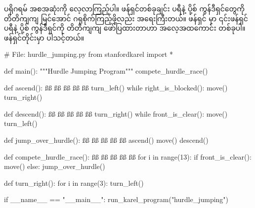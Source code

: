 ပရိုဂရမ် အစအဆုံးကို လေ့လာကြည့်ပါ။ ဖန်ရှင်တစ်ခုချင်း ပရီနဲ့ ပို့စ် ကွန်ဒီရှင်တွေကို တိတိကျကျ မြင်အောင် ဂရုစိုက်ကြည့်ဖို့လည်း အရေးကြီးတယ်။ ဖန်ရှင်  မှာ ၎င်းဖန်ရှင် ပရီနဲ့ ပို့စ် ကွန်ဒီရှင်ကို တိတိကျကျ ဖော်ပြထားတာဟာ အလေ့အထကောင်း တစ်ခုပါ။ ဖန်ရှင်တိုင်းမှာ ပါသင့်တယ်။

%
\begin{py}
# File: hurdle_jumping.py
from stanfordkarel import *


def main():
    """Hurdle Jumping Program"""
    compete_hurdle_race()


def ascend():
    ßß
    ßß
    ßß
    ßß
    ßß
    turn_left()
    while right_is_blocked():
        move()
    turn_right()


def descend():
    ßß
    ßß
    ßß
    ßß
    ßß
    turn_right()
    while front_is_clear():
        move()
    turn_left()


def jump_over_hurdle():
    ßß
    ßß
    ßß
    ßß
    ßß
    ascend()
    move()
    descend()


def compete_hurdle_race():
    ßß
    ßß
    ßß
    ßß
    ßß
    for i in range(13):
        if front_is_clear():
            move()
        else:
            jump_over_hurdle()


def turn_right():
    for i in range(3):
        turn_left()


if __name__ == "__main__":
    run_karel_program("hurdle_jumping")

\end{py}
%


